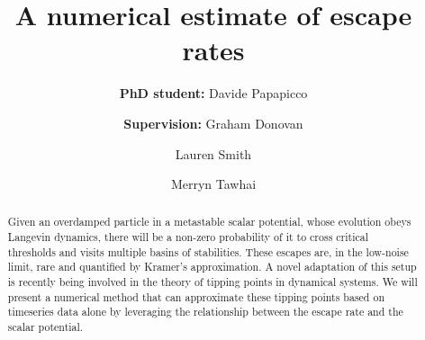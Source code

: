 \documentclass[dvipsnames, table, 11pt]{article}
\begin{document}
     \title{A numerical estimate of escape rates}

     \author[*]{\textbf{PhD student:} Davide Papapicco}
     \author[*]{\authorcr \textbf{Supervision:} Graham Donovan}
     \author[*]{Lauren Smith}
     \author[$\dagger$]{Merryn Tawhai}

 
     \date{}

     \maketitle

     \begin{abstract}
             Given an overdamped particle in a metastable scalar potential, whose evolution obeys Langevin dynamics, there will be a non-zero probability of it to cross critical thresholds and visits multiple basins of stabilities.
             These escapes are, in the low-noise limit, rare and quantified by Kramer's approximation. 
             A novel adaptation of this setup is recently being involved in the theory of tipping points in dynamical systems. 
             We will present a numerical method that can approximate these tipping points based on timeseries data alone by leveraging the relationship between the escape rate and the scalar potential.
     \end{abstract}
\end{document}
